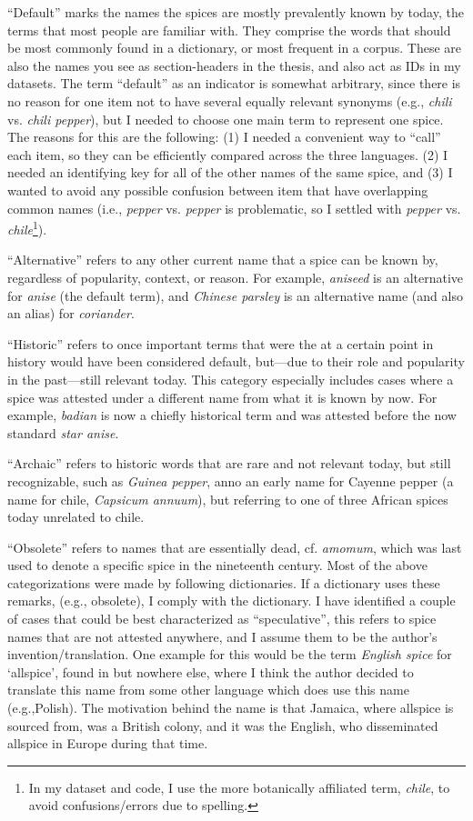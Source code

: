 ``Default'' marks the names the spices are mostly prevalently known by today, the terms that most people are familiar with. They comprise the words that should be most commonly found in a dictionary, or most frequent in a corpus. These are also the names you see as section-headers in the thesis, and also act as IDs in my datasets. The term ``default'' as an indicator is somewhat arbitrary, since there is no reason for one item not to have several equally relevant synonyms (e.g., \textit{chili} vs. \textit{chili pepper}), but I needed to choose one main term to represent one spice. The reasons for this are the following: (1) I needed a convenient way to ``call'' each item, so they can be efficiently compared across the three languages. (2) I needed an identifying key for all of the other names of the same spice, and (3) I wanted to avoid any possible confusion between item that have overlapping common names (i.e., \textit{pepper} vs. \textit{pepper} is problematic, so I settled with \textit{pepper} vs. \textit{chile}\footnote{In my dataset and code, I use the more botanically affiliated term, \textit{chile}, to avoid confusions/errors due to spelling.}).

``Alternative'' refers to any other current name that a spice can be known by, regardless of popularity, context, or reason. For example, \textit{aniseed} is an alternative for \textit{anise} (the default term), and \textit{Chinese parsley} is an alternative name (and also an alias) for \textit{coriander}.

``Historic'' refers to once important terms that were the at a certain point in history would have been considered default, but---due to their role and popularity in the past---still relevant today. This category especially includes cases where a spice was attested under a different name from what it is known by now. For example, \textit{badian} is now a chiefly historical term and was attested before the now standard \textit{star anise}.

``Archaic'' refers to historic words that are rare and not relevant today, but still recognizable, such as \textit{Guinea pepper}, anno an early name for Cayenne pepper (a name for chile, \textit{Capsicum annuum}), but referring to one of three African spices today unrelated to chile.

``Obsolete'' refers to names that are essentially dead, cf. \textit{amomum}, which was last used to denote a specific spice in the nineteenth century. Most of the above categorizations were made by following dictionaries. If a dictionary uses these remarks, (e.g., obsolete), I comply with the dictionary. 
I have identified a couple of cases that could be best characterized as ``speculative'', this refers to spice names that are not attested anywhere, and I assume them to be the author's invention/translation. 
One example for this would be the term \textit{English spice} for `allspice', found in \textcite[64]{raghavan_handbook_2007} but nowhere else, where I think the author decided to translate this name from some other language which does use this name (e.g.,Polish). The motivation behind the name is that Jamaica, where allspice is sourced from, was a British colony, and it was the English, who disseminated allspice in Europe during that time.

